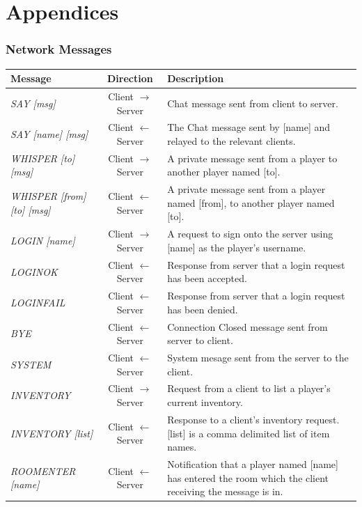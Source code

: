 \documentclass[a4paper]{article}
\begin{document}
\part{Appendices}
\begin{appendices}
\section{Network Messages}\label{app:NetworkMessages}
\begin{longtable}{|l|c|p{8 cm}|}
\hline
Message & Direction & Description\\
\hline
\endhead
\textit{SAY [msg]} & Client $\rightarrow$ Server & Chat message sent from client to server.\\
\hline
\textit{SAY [name] [msg]} & Client $\leftarrow$ Server & The Chat message sent by [name] and relayed to the relevant clients.\\
\hline
\textit{WHISPER [to] [msg]} & Client $\rightarrow$ Server & A private message sent from a player to another player named [to].\\
\hline
\textit{WHISPER [from] [to] [msg]} & Client $\leftarrow$ Server & A private message sent from a player named [from], to another player named [to].\\
\hline
\textit{LOGIN [name]} & Client $\rightarrow$ Server & A request to sign onto the server using [name] as the player's username.\\
\hline
\textit{LOGINOK} & Client $\leftarrow$ Server & Response from server that a login request has been accepted.\\
\hline
\textit{LOGINFAIL} & Client $\leftarrow$ Server & Response from server that a login request has been denied.\\
\hline
\textit{BYE} & Client $\leftarrow$ Server & Connection Closed message sent from server to client.\\
\hline
\textit{SYSTEM} & Client $\leftarrow$ Server & System mesage sent from the server to the client.\\
\hline
\textit{INVENTORY} & Client $\rightarrow$ Server & Request from a client to list a player's current inventory.\\
\hline
\textit{INVENTORY [list]} & Client $\leftarrow$ Server & Response to a client's inventory request. [list] is a comma delimited list of item names.\\
\hline
\textit{ROOMENTER [name]} & Client $\leftarrow$ Server & Notification that a player named [name] has entered the room which the client receiving the message is in.\\

\end{longtable}
\end{appendices}
\end{document}
